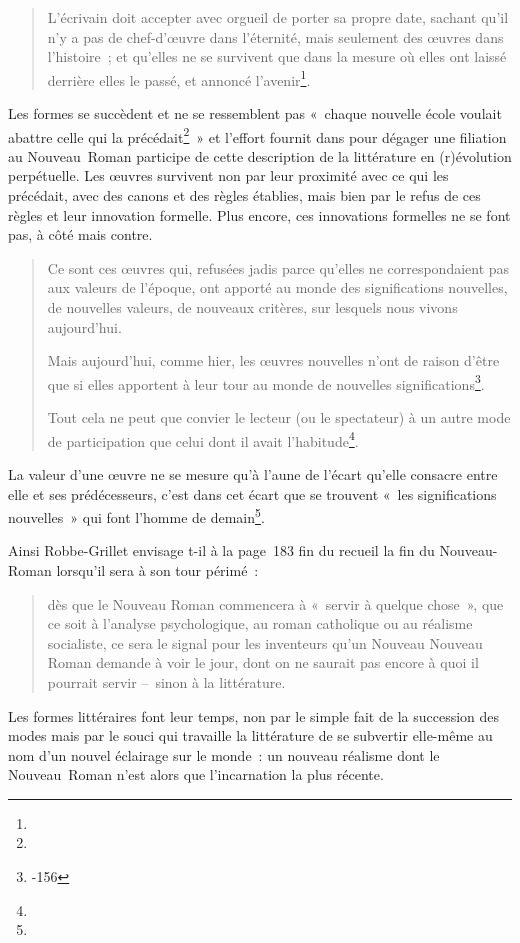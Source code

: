 \begin{quote}
     L'écrivain doit accepter avec orgueil de porter sa propre date, sachant qu'il n'y a pas de chef-d'œuvre dans l'éternité, mais seulement des œuvres dans l'histoire~; et qu'elles ne se survivent que dans la mesure où elles ont laissé derrière elles le passé, et annoncé l'avenir\footnote{}.
\end{quote}
Les formes se succèdent et ne se ressemblent pas «~chaque nouvelle école voulait abattre celle qui la précédait\footnote{}~» et l'effort fournit dans \punr{} pour dégager une filiation au Nouveau~Roman participe de cette description de la littérature en (r)évolution perpétuelle. Les œuvres survivent non par leur proximité avec ce qui les précédait, avec des canons et des règles établies, mais bien par le refus de ces règles et leur innovation formelle. Plus encore, ces innovations formelles ne se font pas, à côté mais contre.
\begin{quote}
    Ce sont ces œuvres qui, refusées jadis parce qu’elles ne correspondaient pas aux valeurs de l’époque, ont apporté au monde des significations nouvelles, de nouvelles valeurs, de nouveaux critères, sur lesquels nous vivons aujourd’hui.

    Mais aujourd’hui, comme hier, les œuvres nouvelles n’ont de raison d’être que si elles apportent à leur tour au monde de nouvelles significations\footnote{-156}.

    Tout cela ne peut que convier le lecteur (ou le spectateur) à un autre mode de participation que celui dont il avait l’habitude\footnote{}.
\end{quote}

La valeur d'une œuvre ne se mesure qu'à l'aune de l'écart qu'elle consacre entre elle et ses prédécesseurs, c'est dans cet écart que se trouvent «~les significations nouvelles~» qui font l'homme de demain\footnote{}.

Ainsi Robbe-Grillet envisage t-il à la page~183 fin du recueil la fin du Nouveau-Roman lorsqu'il sera à son tour périmé~:
\begin{quote}
   dès que le Nouveau Roman commencera à «~servir à quelque chose~», que ce soit à l’analyse psychologique, au roman catholique ou au réalisme socialiste, ce sera le signal pour les inventeurs qu’un Nouveau Nouveau Roman demande à voir le jour, dont on ne saurait pas encore à quoi il pourrait servir –~sinon à la littérature.
\end{quote}

Les formes littéraires font leur temps, non par le simple fait de la succession des modes mais par le souci qui travaille la littérature de se subvertir elle-même au nom d'un nouvel éclairage sur le monde~: un nouveau réalisme dont le Nouveau~Roman n'est alors que l'incarnation la plus récente.


